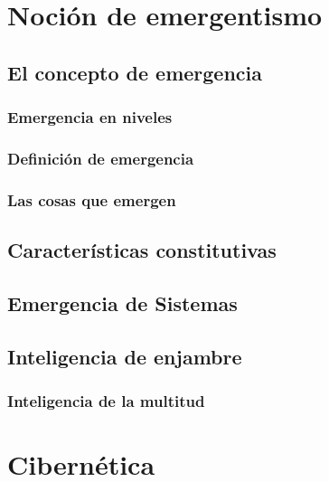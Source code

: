 \section{Noción de  emergentismo}
\subsection{El concepto de emergencia}
\subsubsection{Emergencia en niveles}
\subsubsection{Definición de emergencia}
\subsubsection{Las cosas que emergen}

\subsection{Características constitutivas}
\subsection{Emergencia de Sistemas}
\subsection{Inteligencia de enjambre}
\subsubsection{Inteligencia de la multitud}

\section{Cibernética}
